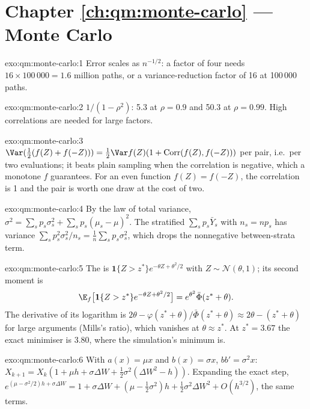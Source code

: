 \section*{Chapter \ref{ch:qm:monte-carlo} --- Monte Carlo}

\begin{solution}{exo:qm:monte-carlo:1}
Error scales as $n^{-1/2}$: a factor of four needs $16 \times 100\,000 = 1.6$ million paths, or a variance-reduction factor of 16 at 100\,000 paths.
\end{solution}

\begin{solution}{exo:qm:monte-carlo:2}
$1/(1 - \rho^2)$: 5.3 at $\rho = 0.9$ and 50.3 at $\rho = 0.99$. High correlations are needed for large factors.
\end{solution}

\begin{solution}{exo:qm:monte-carlo:3}
$\Var(\frac12(f(Z) + f(-Z))) = \frac12\Var f(Z)(1 + \mathrm{Corr}(f(Z), f(-Z)))$ per pair, i.e.\ per two evaluations; it beats plain sampling when the correlation is negative, which a monotone $f$
guarantees. For an even function $f(Z) = f(-Z)$, the correlation is 1 and the pair is worth one draw at the cost of two.
\end{solution}

\begin{solution}{exo:qm:monte-carlo:4}
By the law of total variance, $\sigma^2 = \sum_sp_s\sigma_s^2 + \sum_sp_s(\mu_s - \mu)^2$. The stratified  $\sum_sp_s\bar Y_s$ with $n_s = np_s$ has variance $\sum_sp_s^2\sigma_s^2/n_s =
\frac1n\sum_sp_s\sigma_s^2$, which drops the nonnegative between-strata term.
\end{solution}

\begin{solution}{exo:qm:monte-carlo:5}
The  is $\mathbf 1\{Z > z^*\}e^{-\theta Z + \theta^2/2}$ with $Z \sim \mathcal N(\theta, 1)$; its second moment is
\[\E_f\bigl[\mathbf 1\{Z > z^*\}e^{-\theta Z + \theta^2/2}\bigr] = e^{\theta^2}\bar\Phi(z^* + \theta).\]
The derivative of its logarithm is $2\theta - \varphi(z^* + \theta)/\bar\Phi(z^* + \theta) \approx 2\theta - (z^* + \theta)$ for large arguments (Mills's ratio), which vanishes at $\theta \approx z^*$. At $z^* = 3.67$
the exact minimiser is 3.80, where the simulation's minimum is.
\end{solution}

\begin{solution}{exo:qm:monte-carlo:6}
With $a(x) = \mu x$ and $b(x) = \sigma x$, $bb' = \sigma^2x$: $X_{k+1} = X_k(1 + \mu h + \sigma\Delta W + \frac12\sigma^2(\Delta W^2 - h))$. Expanding the exact step,
$e^{(\mu - \sigma^2/2)h + \sigma\Delta W} = 1 + \sigma\Delta W + (\mu - \frac12\sigma^2)h + \frac12\sigma^2\Delta W^2 + O(h^{3/2})$, the same terms.
\end{solution}

